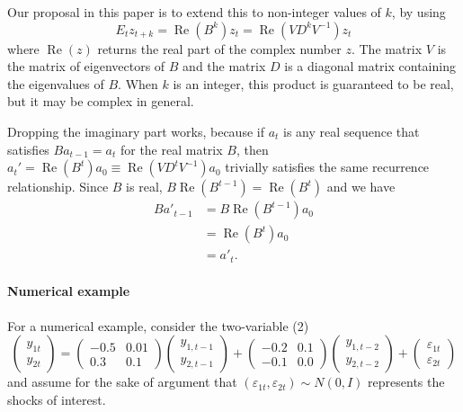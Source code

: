 \documentclass[12pt,fleqn]{article}
\renewcommand{\Re}{\operatorname{Re}}
\newcommand{\vep}{\varepsilon}
\begin{document}
Our proposal in this paper is to extend this to non-integer values of
$k$, by using
\[
E_t z_{t+k} = \Re(B^k) z_{t} = \Re(V D^k V^{-1}) z_t
\]
where $\Re(z)$ returns the real part of the complex number $z$. The
matrix $V$ is the matrix of eigenvectors of $B$ and the matrix $D$ is
a diagonal matrix containing the eigenvalues of $B$. When $k$ is an
integer, this product is guaranteed to be real, but it may be complex
in general.

Dropping the imaginary part works, because if $a_t$ is any real
sequence that satisfies $B a_{t-1} = a_t$ for the real matrix $B$,
then $a_t' = \Re(B^t) a_{0} \equiv \Re(V D^t V^{-1}) a_0$ trivially
satisfies the same recurrence relationship. Since $B$ is real, $B
\Re(B^{t-1}) = \Re(B^t)$ and we have
\begin{align*}
B a'_{t-1} &= B \Re(B^{t-1}) a_{0} \\
&= \Re(B^t) a_0 \\
&= a'_t.
\end{align*}

\paragraph{Numerical example}

For a numerical example, consider the two-variable \VAR(2)
\begin{equation}
  \begin{pmatrix}
    y_{1t} \\ y_{2t}
  \end{pmatrix}
  =
  \begin{pmatrix}
    - 0.5 & 0.01 \\ 0.3 & 0.1
  \end{pmatrix}
  \begin{pmatrix}
    y_{1,t-1} \\ y_{2,t-1}
  \end{pmatrix}
  +
  \begin{pmatrix}
    -0.2 & 0.1 \\ -0.1 & 0.0
  \end{pmatrix}
  \begin{pmatrix}
    y_{1,t-2} \\ y_{2,t-2}
  \end{pmatrix}
  +
  \begin{pmatrix}
    \vep_{1t} \\ \vep_{2t}
  \end{pmatrix}
\end{equation}
and assume for the sake of argument that $(\vep_{1t},\vep_{2t}) \sim
N(0,I)$ represents the shocks of interest.
\end{document}
